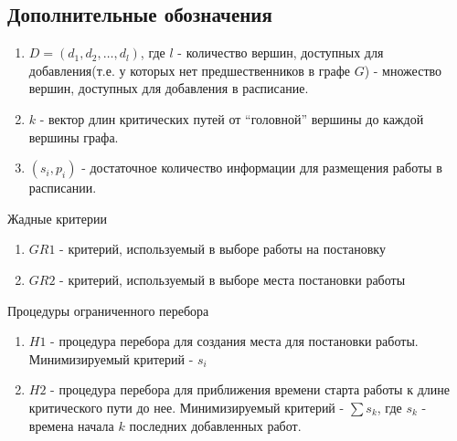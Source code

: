 \subsection{Дополнительные обозначения}
\begin{enumerate}
    \item $D= \left( d_1, d_2, \dots, d_l \right)$, где $l$ - количество вершин, доступных для добавления(т.е. у которых нет предшественников в графе $G$) - множество вершин, доступных для добавления в расписание.
    \item $k$ - вектор длин критических путей от ``головной'' вершины до каждой вершины графа.
    \item $\left( s_i, p_i \right)$ - достаточное количество информации для размещения работы в расписании.
\end{enumerate}
Жадные критерии
\begin{enumerate}
    \item $GR1$ - критерий, используемый в выборе работы на постановку
    \item $GR2$ - критерий, используемый в выборе места постановки работы
\end{enumerate}
Процедуры ограниченного перебора
\begin{enumerate}
    \item $H1$ - процедура перебора для создания места для постановки работы. Минимизируемый критерий - $s_i$
    \item $H2$ - процедура перебора для приближения времени старта работы к длине критического пути до нее. Минимизируемый критерий - $\sum s_k$, где $s_k$ - времена начала $k$ последних добавленных работ.
\end{enumerate}

